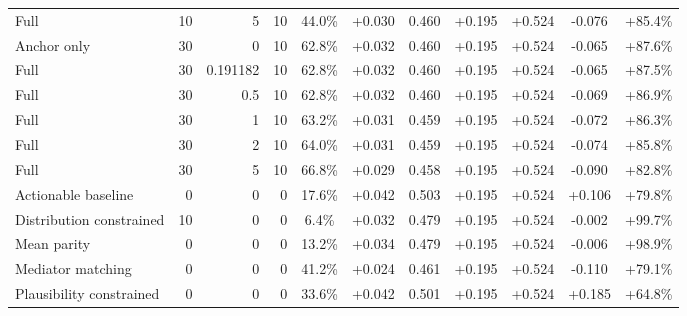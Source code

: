 \begin{table}[htbp]
\begin{tabular}{lrrrccccccc}
Full & 10 & 5 & 10 & 44.0\% & +0.030 & 0.460 & +0.195 & +0.524 & -0.076 & +85.4\% \\
Anchor only & 30 & 0 & 10 & 62.8\% & +0.032 & 0.460 & +0.195 & +0.524 & -0.065 & +87.6\% \\
Full & 30 & 0.191182 & 10 & 62.8\% & +0.032 & 0.460 & +0.195 & +0.524 & -0.065 & +87.5\% \\
Full & 30 & 0.5 & 10 & 62.8\% & +0.032 & 0.460 & +0.195 & +0.524 & -0.069 & +86.9\% \\
Full & 30 & 1 & 10 & 63.2\% & +0.031 & 0.459 & +0.195 & +0.524 & -0.072 & +86.3\% \\
Full & 30 & 2 & 10 & 64.0\% & +0.031 & 0.459 & +0.195 & +0.524 & -0.074 & +85.8\% \\
Full & 30 & 5 & 10 & 66.8\% & +0.029 & 0.458 & +0.195 & +0.524 & -0.090 & +82.8\% \\
Actionable baseline & 0 & 0 & 0 & 17.6\% & +0.042 & 0.503 & +0.195 & +0.524 & +0.106 & +79.8\% \\
Distribution constrained & 10 & 0 & 0 & 6.4\% & +0.032 & 0.479 & +0.195 & +0.524 & -0.002 & +99.7\% \\
Mean parity & 0 & 0 & 0 & 13.2\% & +0.034 & 0.479 & +0.195 & +0.524 & -0.006 & +98.9\% \\
Mediator matching & 0 & 0 & 0 & 41.2\% & +0.024 & 0.461 & +0.195 & +0.524 & -0.110 & +79.1\% \\
Plausibility constrained & 0 & 0 & 0 & 33.6\% & +0.042 & 0.501 & +0.195 & +0.524 & +0.185 & +64.8\% \\
\bottomrule
\end{tabular}
\end{table}